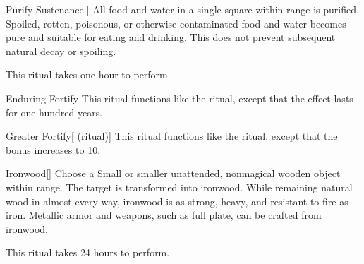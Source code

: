 \lowercase{\hypertarget{spell:Purify Sustenance}{}}\label{spell:Purify Sustenance}
\begin{apability}[\nth{1}]{\hypertarget{spell:Purify Sustenance}{Purify Sustenance}}[]
All food and water in a single square within \rngclose range is purified.
Spoiled, rotten, poisonous, or otherwise contaminated food and water becomes pure and suitable for eating and drinking.
This does not prevent subsequent natural decay or spoiling.

This ritual takes one hour to perform.
\end{apability}
\vspace{0.25em}



\lowercase{\hypertarget{spell:Enduring Fortify}{}}\label{spell:Enduring Fortify}
\begin{apability}[\nth{3}]{\hypertarget{spell:Enduring Fortify}{Enduring Fortify}}
This ritual functions like the  ritual, except that the effect lasts for one hundred years.
\end{apability}
\vspace{0.25em}



\lowercase{\hypertarget{spell:Greater Fortify}{}}\label{spell:Greater Fortify}
\begin{attuneability}[\nth{3}]{\hypertarget{spell:Greater Fortify}{Greater Fortify}}[ (ritual)]
This ritual functions like the  ritual, except that the  bonus increases to 10.
\end{attuneability}
\vspace{0.25em}



\lowercase{\hypertarget{spell:Ironwood}{}}\label{spell:Ironwood}
\begin{apability}[\nth{3}]{\hypertarget{spell:Ironwood}{Ironwood}}[]
Choose a Small or smaller unattended, nonmagical wooden object within \rngclose range.
The target is transformed into ironwood.
While remaining natural wood in almost every way, ironwood is as strong, heavy, and resistant to fire as iron.
Metallic armor and weapons, such as full plate, can be crafted from ironwood.

This ritual takes 24 hours to perform.
\end{apability}
\vspace{0.25em}



